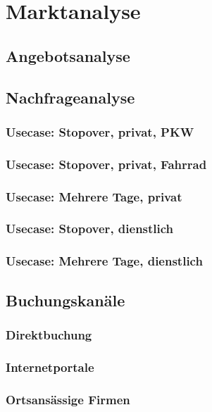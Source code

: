\section{Marktanalyse}
\label{sec:markt}

\subsection{Angebotsanalyse}

\subsection{Nachfrageanalyse}

\subsubsection{Usecase: Stopover, privat, PKW}

\subsubsection{Usecase: Stopover, privat, Fahrrad}

\subsubsection{Usecase: Mehrere Tage, privat}


\subsubsection{Usecase: Stopover, dienstlich}

\subsubsection{Usecase: Mehrere Tage, dienstlich}

\subsection{Buchungskanäle}

\subsubsection{Direktbuchung}

\subsubsection{Internetportale}
\subsubsection{Ortsansässige Firmen}

